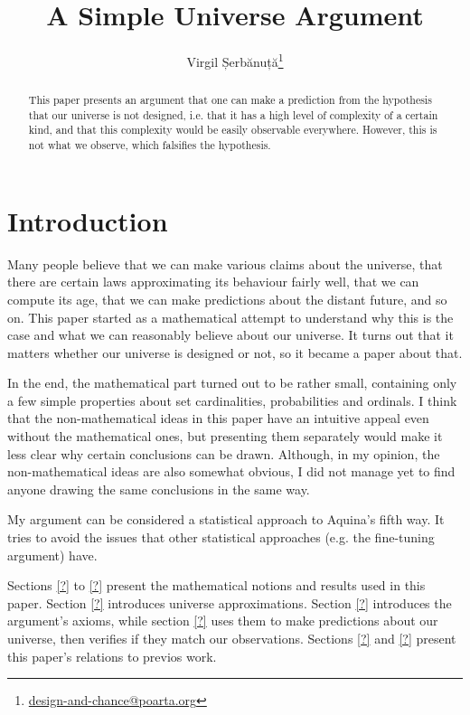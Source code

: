 \documentclass[a4paper
,draft
]{article}
\title{A Simple Universe Argument}
\author{Virgil Șerbănuță\thanks{\href{mailto:design-and-chance@poarta.org}{design-and-chance@poarta.org}}}
\newcommand{\svn}[2][]{\todo[author=Virgil,color=red!25!white,#1]{#2}}
\newcommand{\paper}[1]{paper}
\begin{document}
\maketitle

 \begin{abstract}
  This \paper{} presents an argument that one can make a prediction from
  the hypothesis that our universe is not designed, i.e. that it has a high
  level of complexity of a certain kind, and that this complexity would be
  easily observable everywhere. However, this is not what we observe, which
  falsifies the hypothesis. \svn{Make sure I actually made a prediction.}
\end{abstract}

\section{Introduction}

Many people believe
that we can make various claims about the universe,
that there are certain laws approximating its behaviour fairly well,
that we can compute its age,
that we can make predictions about the distant future, and so on.
This \paper{} started as a
mathematical attempt to understand why this is the case
and what we can reasonably believe about our universe.
It turns out that it matters
whether our universe is designed or not, so it became a \paper{} about that.

In the end, the mathematical part turned out to be rather small,
containing only a few simple properties about set cardinalities,
probabilities and ordinals.
I think that the non-mathematical ideas in this paper
have an intuitive appeal even without the mathematical ones,
but presenting them separately would make it less clear why certain
conclusions can be drawn.
Although, in my opinion, the non-mathematical ideas are also somewhat obvious,
I did not manage yet to find anyone drawing the same conclusions
in the same way.

My argument can be considered a statistical approach to Aquina's fifth way.
It tries to avoid the issues that other statistical approaches (e.g. the
fine-tuning argument) have.

Sections \ref{?} to \ref{?} present the mathematical notions and results used
in this paper. Section \ref{?} introduces universe approximations. Section
\ref{?} introduces the argument's axioms, while section \ref{?} uses them
to make predictions about our universe, then verifies if they match our
observations. Sections \ref{?} and \ref{?} present this paper's relations to
previos work.
\end{document}
